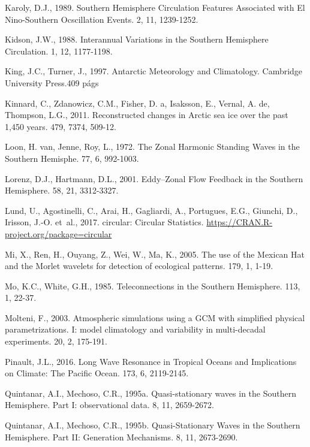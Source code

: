 \documentclass[spanish,a4paper,12pt,oneside]{book}
\begin{document}
\hypertarget{ref-Karoly1989}{}
Karoly, D.J., 1989. Southern Hemisphere Circulation Features Associated
with El Nino-Southern Ocscillation Events. 2, 11, 1239-1252.

\hypertarget{ref-Kidson1988}{}
Kidson, J.W., 1988. Interannual Variations in the Southern Hemisphere
Circulation. 1, 12, 1177-1198.

\hypertarget{ref-King1997}{}
King, J.C., Turner, J., 1997. Antarctic Meteorology and Climatology.
Cambridge University Press.409 págs

\hypertarget{ref-Kinnard2011}{}
Kinnard, C., Zdanowicz, C.M., Fisher, D. a, Isaksson, E., Vernal, A. de,
Thompson, L.G., 2011. Reconstructed changes in Arctic sea ice over the
past 1,450 years. 479, 7374, 509-12.

\hypertarget{ref-Loon1972}{}
Loon, H. van, Jenne, Roy, L., 1972. The Zonal Harmonic Standing Waves in
the Southern Hemisphe. 77, 6, 992-1003.

\hypertarget{ref-Lorenz2001}{}
Lorenz, D.J., Hartmann, D.L., 2001. Eddy--Zonal Flow Feedback in the
Southern Hemisphere. 58, 21, 3312-3327.

\hypertarget{ref-R-circular}{}
Lund, U., Agostinelli, C., Arai, H., Gagliardi, A., Portugues, E.G.,
Giunchi, D., Irisson, J.-O. et~al., 2017. circular: Circular Statistics.
\url{https://CRAN.R-project.org/package=circular}

\hypertarget{ref-Mi2005}{}
Mi, X., Ren, H., Ouyang, Z., Wei, W., Ma, K., 2005. The use of the
Mexican Hat and the Morlet wavelets for detection of ecological
patterns. 179, 1, 1-19.

\hypertarget{ref-Mo1985}{}
Mo, K.C., White, G.H., 1985. Teleconnections in the Southern Hemisphere.
113, 1, 22-37.

\hypertarget{ref-Molteni2003}{}
Molteni, F., 2003. Atmospheric simulations using a GCM with simplified
physical parametrizations. I: model climatology and variability in
multi-decadal experiments. 20, 2, 175-191.

\hypertarget{ref-Pinault2016}{}
Pinault, J.L., 2016. Long Wave Resonance in Tropical Oceans and
Implications on Climate: The Pacific Ocean. 173, 6, 2119-2145.

\hypertarget{ref-Quintanar1995a}{}
Quintanar, A.I., Mechoso, C.R., 1995a. Quasi-stationary waves in the
Southern Hemisphere. Part I: observational data. 8, 11, 2659-2672.

\hypertarget{ref-Quintanar1995}{}
Quintanar, A.I., Mechoso, C.R., 1995b. Quasi-Stationary Waves in the
Southern Hemisphere. Part II: Generation Mechanisms. 8, 11, 2673-2690.
\end{document}
